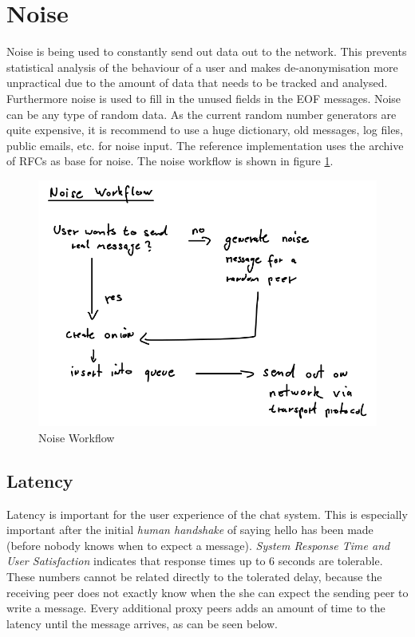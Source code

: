\section{Noise}
\label{noise}
Noise is being used to constantly send out data out to the network.
This prevents statistical analysis of the behaviour of a user and makes
de-anonymisation more unpractical due to the amount of data that needs
to be tracked and analysed.
Furthermore noise is used to fill in the unused fields in the EOF messages.
Noise can be any type of random data. As the current random number generators
are quite expensive, it is recommend to use a huge dictionary, old 
messages, log files, public emails, etc. for noise input.
The reference implementation uses the archive of RFCs as base for noise.
The noise workflow is shown in figure \ref{noiseworkflow}.
\begin{figure}
    \centering
    \caption{Noise Workflow}
    \label{noiseworkflow}
    \includegraphics[scale=0.8]{noiseworkflow.png}
\end{figure}

\subsection{Latency}
\label{latency}
Latency is important for the user experience of the chat system.
This is especially important after the initial \textit{human handshake}
of saying hello has been made (before nobody knows when to expect
a message).
\textit{System Response Time and User Satisfaction}\cite{responsetime}
indicates that response times up to 6 seconds are tolerable. These numbers
cannot be related directly to the tolerated delay, because the receiving
peer does not exactly know when the she can expect the sending peer to write
a message.
Every additional proxy peers adds an amount of time to the latency until the
message arrives, as can be seen below.
